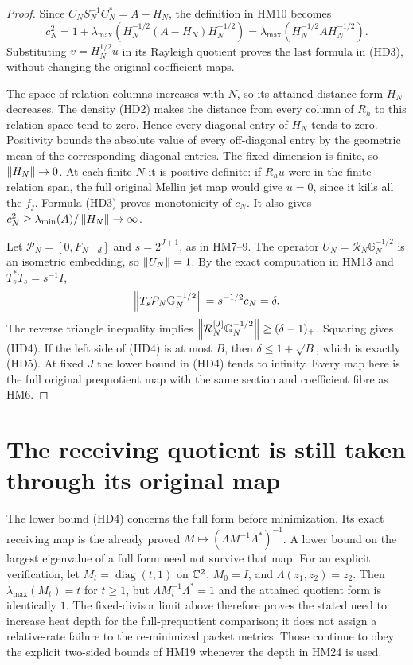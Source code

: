 \documentclass[11pt]{article}
\begin{document}
\begin{proof}
Since $C_NS_N^{-1}C_N^*=A-H_N$, the definition in HM10 becomes
\[
 c_N^2=1+\lambda_{\max}
       (H_N^{-1/2}(A-H_N)H_N^{-1/2})
       =\lambda_{\max}(H_N^{-1/2}AH_N^{-1/2}).
\]
Substituting $v=H_N^{1/2}u$ in its Rayleigh quotient proves the last
formula in (HD3), without changing the original coefficient maps.

The space of relation columns increases with $N$, so its attained
distance form $H_N$ decreases. The density (HD2) makes the distance
from every column of $R_h$ to this relation space tend to zero.
Hence every diagonal entry of $H_N$ tends to zero. Positivity bounds
the absolute value of every off-diagonal entry by the geometric mean
of the corresponding diagonal entries. The fixed dimension is finite,
so $\left\lVert H_N\right\rVert\to0$. At each finite $N$ it is positive definite:
if $R_hu$ were in the finite relation span, the full original Mellin
jet map would give $u=0$, since it kills all the $f_j$.
Formula (HD3) proves monotonicity of $c_N$. It also gives
$c_N^2\ge\lambda_{\min}(A)/\left\lVert H_N\right\rVert\to\infty$.

Let $\mathcal P_N=[0,F_{N-d}]$ and $s=2^{J+1}$, as in HM7--9.
The operator $U_N=\mathcal R_N\mathbb G_N^{-1/2}$ is an isometric
embedding, so $\left\lVert U_N\right\rVert=1$. By the exact computation in HM13 and
$T_s^*T_s=s^{-1}I$,
\[
 \left\lVert T_s\mathcal P_N\mathbb G_N^{-1/2}\right\rVert=s^{-1/2}c_N=\delta.
\]
The reverse triangle inequality implies
$\left\lVert\mathcal R_N^{[J]}\mathbb G_N^{-1/2}\right\rVert\ge(\delta-1)_+$.
Squaring gives (HD4). If the left side of (HD4) is at most $B$,
then $\delta\le1+\sqrt B$, which is exactly (HD5). At fixed $J$
the lower bound in (HD4) tends to infinity. Every map here is the
full original prequotient map with the same section and coefficient
fibre as HM6.
\end{proof}

\section{The receiving quotient is still taken through its original map}
The lower bound (HD4) concerns the full form before minimization.
Its exact receiving map is the already proved
$M\mapsto(\Lambda M^{-1}\Lambda^*)^{-1}$. A lower bound on the
largest eigenvalue of a full form need not survive that map. For an
explicit verification, let $M_t=\operatorname{diag}(t,1)$ on $\mathbb C^2$,
$M_0=I$, and $\Lambda(z_1,z_2)=z_2$. Then
$\lambda_{\max}(M_t)=t$ for $t\ge1$, but
$\Lambda M_t^{-1}\Lambda^*=1$ and the attained quotient form is
identically $1$. The fixed-divisor limit above therefore proves the
stated need to increase heat depth for the full-prequotient comparison;
it does not assign a relative-rate failure to the re-minimized packet
metrics. Those continue to obey the explicit two-sided bounds of
HM19 whenever the depth in HM24 is used.
\end{document}
